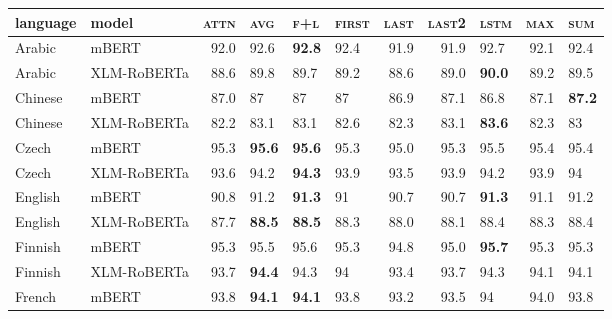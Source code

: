\begin{tabular}{llrlllrrlrl}
\toprule
\textbf{language} & \textbf{model} &  \textsc{attn} & \textsc{avg} & \textsc{f+l} & \textsc{first} &  \textsc{last} &  \textsc{last2} & \textsc{lstm} &  \textsc{max} & \textsc{sum} \\
\midrule
           Arabic &          mBERT &           92.0 &         92.6 &   \textbf{92.8} &           92.4 &           91.9 &            91.9 &          92.7 &          92.1 &         92.4 \\
           Arabic &    XLM-RoBERTa &           88.6 &         89.8 &         89.7 &           89.2 &           88.6 &            89.0 &    \textbf{90.0} &          89.2 &         89.5 \\
          Chinese &          mBERT &           87.0 &           87 &           87 &             87 &           86.9 &            87.1 &          86.8 &          87.1 &   \textbf{87.2} \\
          Chinese &    XLM-RoBERTa &           82.2 &         83.1 &         83.1 &           82.6 &           82.3 &            83.1 &    \textbf{83.6} &          82.3 &           83 \\
            Czech &          mBERT &           95.3 &   \textbf{95.6} &   \textbf{95.6} &           95.3 &           95.0 &            95.3 &          95.5 &          95.4 &         95.4 \\
            Czech &    XLM-RoBERTa &           93.6 &         94.2 &   \textbf{94.3} &           93.9 &           93.5 &            93.9 &          94.2 &          93.9 &           94 \\
          English &          mBERT &           90.8 &         91.2 &   \textbf{91.3} &             91 &           90.7 &            90.7 &    \textbf{91.3} &          91.1 &         91.2 \\
          English &    XLM-RoBERTa &           87.7 &   \textbf{88.5} &   \textbf{88.5} &           88.3 &           88.0 &            88.1 &          88.4 &          88.3 &         88.4 \\
          Finnish &          mBERT &           95.3 &         95.5 &         95.6 &           95.3 &           94.8 &            95.0 &    \textbf{95.7} &          95.3 &         95.3 \\
          Finnish &    XLM-RoBERTa &           93.7 &   \textbf{94.4} &         94.3 &             94 &           93.4 &            93.7 &          94.3 &          94.1 &         94.1 \\
           French &          mBERT &           93.8 &   \textbf{94.1} &   \textbf{94.1} &           93.8 &           93.2 &            93.5 &            94 &          94.0 &         93.8 \\

\end{tabular}

